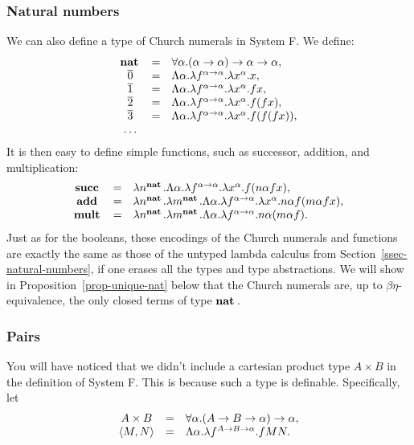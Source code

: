 \documentclass{article}
\begin{document}
\subsubsection{Natural numbers}

We can also define a type of Church numerals in System F. We define:
\[ \begin{array}{ccl}
  \mathop{\textbf{\bf nat}\,} &=& \forall\alpha.(\alpha\to\alpha)\to\alpha\to\alpha,\\
  \mathop{\overline{0}} &=& \Lambda\alpha.\lambda f^{\alpha\to\alpha}.\lambda x^{\alpha}.x,\\
  \mathop{\overline{1}} &=& \Lambda\alpha.\lambda f^{\alpha\to\alpha}.\lambda x^{\alpha}.fx,\\
  \mathop{\overline{2}} &=& \Lambda\alpha.\lambda f^{\alpha\to\alpha}.\lambda x^{\alpha}.f(fx),\\
  \mathop{\overline{3}} &=&
  \Lambda\alpha.\lambda f^{\alpha\to\alpha}.\lambda x^{\alpha}.f(f(fx)),\\
  \ldots
\end{array}
\]
It is then easy to define simple functions, such as successor,
addition, and multiplication:
\[ \begin{array}{ccl}
  \mathop{\textbf{\bf succ}\,} &=& \lambda n^{\mathop{\textbf{\bf nat}\,}}.\Lambda\alpha.\lambda f^{\alpha\to\alpha}.\lambda x^{\alpha}.f(n\alpha f x),\\
  \mathop{\textbf{\bf add}\,} &=&  \lambda n^{\mathop{\textbf{\bf nat}\,}}.\lambda m^{\mathop{\textbf{\bf nat}\,}}.\Lambda\alpha.\lambda f^{\alpha\to\alpha}.\lambda x^{\alpha}.n\alpha f(m\alpha fx), \\
  \mathop{\textbf{\bf mult}\,} &=& \lambda n^{\mathop{\textbf{\bf nat}\,}}.\lambda m^{\mathop{\textbf{\bf nat}\,}}.\Lambda\alpha.\lambda f^{\alpha\to\alpha}.n\alpha (m\alpha f).
\end{array}
\]
Just as for the booleans, these encodings of the Church numerals and
functions are exactly the same as those of the untyped lambda calculus
from Section~\ref{ssec-natural-numbers}, if one erases all the types
and type abstractions.  We will show in
Proposition~\ref{prop-unique-nat} below that the Church numerals are,
up to $\beta\eta$-equivalence, the only closed terms of type $\mathop{\textbf{\bf nat}\,}$.

\subsubsection{Pairs}\label{ssec-pairs}

You will have noticed that we didn't include a cartesian product type
$A\times B$ in the definition of System F. This is because such a type
is definable. Specifically, let
\[ \begin{array}{ccl}
  A\times B &=& \forall\alpha.(A\to B\to\alpha)\to\alpha,\\
  \langle M,N\rangle &=& \Lambda\alpha.\lambda f^{A\to B\to\alpha}.fMN.
\end{array}
\]
\end{document}
